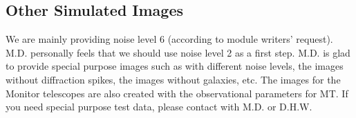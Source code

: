 \begin{center}
\bigskip
\section{ Other  Simulated Images}
\smallskip
\end{center}

We are mainly providing noise level 6 (according to module writers'
request). M.D. personally feels that we should use noise level 2 
as a first step. M.D. is glad to provide special purpose images such as 
with different noise levels, the images without diffraction spikes, the 
images without galaxies, etc. The images for the Monitor telescopes are 
also created with the observational parameters for MT.
If you need special purpose test data, please contact with M.D. or D.H.W.


